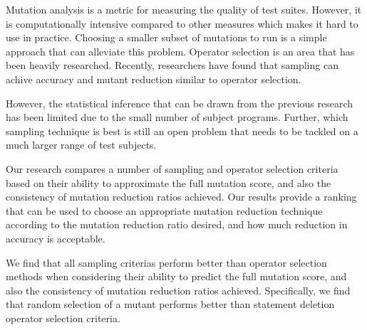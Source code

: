 Mutation analysis is a metric for measuring the quality of test
suites. However, it is computationally intensive compared to other measures
which makes it hard to use in practice. Choosing a smaller subset of mutations
to run is a simple approach that can alleviate this problem.
Operator selection is an area that has been heavily researched. Recently,
researchers have found that sampling can achive accuracy and mutant
reduction similar to operator selection.

However, the statistical inference that can be drawn from the previous
research has been limited due to the small number of subject programs. Further,
which sampling technique is best is still an open problem that needs to be
tackled on a much larger range of test subjects.

Our research compares a number of sampling and operator selection criteria
based on their ability to approximate the full mutation score, and also
the consistency of mutation reduction ratios achieved. Our results provide
a ranking that can be used to choose an appropriate mutation reduction
technique according to the mutation reduction ratio desired, and how much
reduction in accuracy is acceptable.

We find that all sampling criterias perform better than operator selection
methods when considering their ability to predict the full mutation score,
and also the consistency of mutation reduction ratios achieved.  Specifically,
we find that random selection of a mutant performs better than statement
deletion operator selection criteria.

